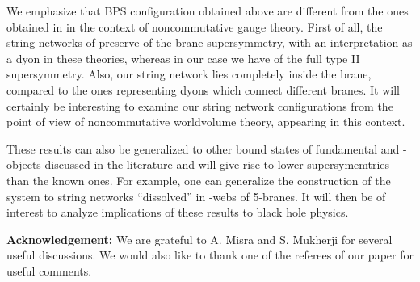 \documentclass[a4paper,12pt]{article}
\begin{document}
We emphasize that BPS configuration obtained above are
different from the ones  obtained in \cite{hashi} in 
the context of noncommutative gauge 
theory. First of all, the string networks of \cite{hashi} 
preserve \coordHE{} \cite{bergman}
of the \coordHE{} brane supersymmetry, with an interpretation 
as a dyon in these theories, whereas in our case we have 
\coordHE{} of the full type II supersymmetry. Also, our string 
network lies completely inside the
\coordHE{} brane, compared to the ones representing dyons which connect
different branes. It will certainly be interesting to 
examine our string network configurations from the point of view of  
noncommutative worldvolume theory, appearing in this context.


These results can also be generalized to other bound states of 
fundamental and \coordHE{}-objects discussed in the literature \cite{lu,lu1} 
and will give rise to lower supersymemtries than the known ones. 
For example, one can generalize the construction of the \coordHE{}
system\cite{malda-russo} to string networks ``dissolved'' in 
\coordHE{}-webs of 5-branes. It will then be of interest to analyze 
implications of these results to black hole physics.



{\bf Acknowledgement: } We are grateful to  A. Misra and S. Mukherji 
for several useful discussions. We would also like to thank one 
of the referees of our paper for useful comments. 
\end{document}
